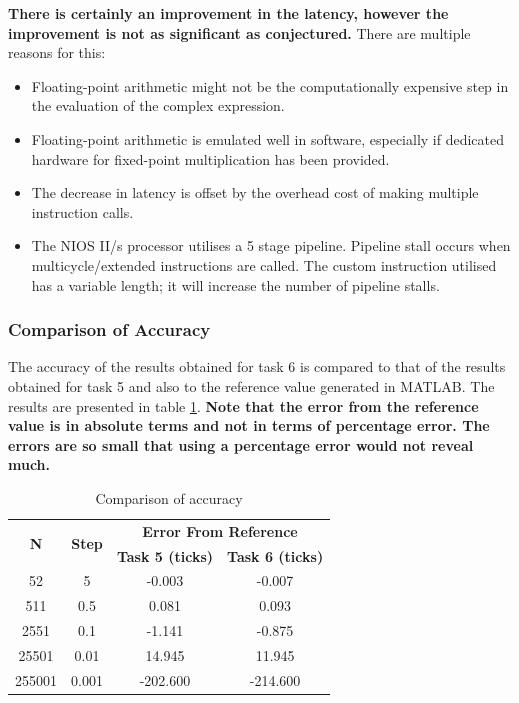 \documentclass{article}
\begin{document}
\textbf{There is certainly an improvement in the latency, however the improvement is not as significant as conjectured.} There are multiple reasons for this:
\begin{itemize}
    \item Floating-point arithmetic might not be the computationally expensive step in the evaluation of the complex expression.
    \item Floating-point arithmetic is emulated well in software, especially if dedicated hardware for fixed-point multiplication has been provided. 
    \item The decrease in latency is offset by the overhead cost of making multiple instruction calls.
    \item The NIOS II/s processor utilises a 5 stage pipeline. Pipeline stall occurs when multicycle/extended instructions are called. The custom instruction utilised has a variable length; it will increase the number of pipeline stalls. 
\end{itemize}
\newpage
\subsubsection{Comparison of Accuracy}
The accuracy of the results obtained for task 6 is compared to that of the results obtained for task 5 and also to the reference value generated in MATLAB. The results are presented in table \ref{tab:task6_accuracy}. \textbf{Note that the error from the reference value is in absolute terms and not in terms of percentage error. The errors are so small that using a percentage error would not reveal much.}

\begin{table}[H]
  \centering
    \begin{tabular}{|c|c|c|c|}
    \hline
    \multirow{2}{*}{\textbf{N}} & \multirow{2}{*}{\textbf{Step}} & \multicolumn{2}{c|}{\textbf{Error From Reference}} \\
\cline{3-4}          &       & \textbf{Task 5 (ticks)} & \textbf{Task 6 (ticks)} \\
    \hline
    52    & 5     & -0.003 & -0.007 \\
    \hline
    511   & 0.5   & 0.081 & 0.093 \\
    \hline
    2551  & 0.1   & -1.141 & -0.875 \\
    \hline
    25501 & 0.01  & 14.945 & 11.945 \\
    \hline
    255001 & 0.001 & -202.600 & -214.600 \\
    \hline
    \end{tabular}%
  \caption{Comparison of accuracy}
  \label{tab:task6_accuracy}%
\end{table}%
\end{document}

